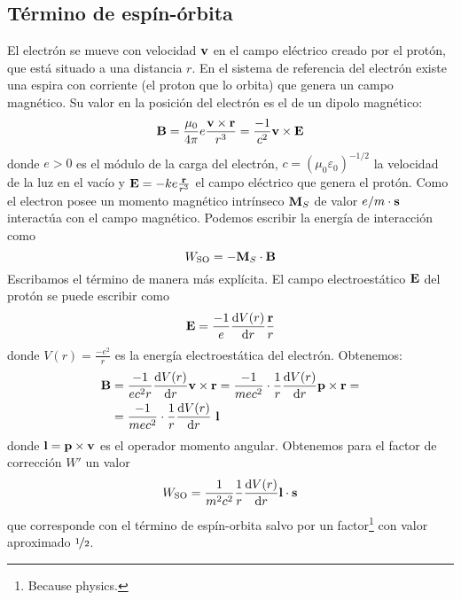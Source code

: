 \subsection{Término de espín-órbita}
El electrón se mueve con velocidad $\bm{\mathrm{v}}$ en el campo eléctrico
creado por el protón, que está situado a una distancia $r$. En el sistema de referencia del electrón existe
una espira con corriente (el proton que lo orbita) que genera un campo
magnético. Su valor en la posición del electrón es el de un dipolo magnético:
\begin{equation}
\bm{\mathrm{B}}= \frac{\mu_0}{4\pi} e \frac{\bm{\mathrm{v}}\times
  \bm{\mathrm{r}}}{r^3} = \frac{-1}{c^2} \bm{\mathrm{v}}\times \bm{\mathrm{E}}
\end{equation}
donde $e > 0$ es el módulo de la carga del electrón, $c = (\mu_0
\varepsilon_0)^{-1/2}$ la velocidad de la luz en el vacío y $\bm{\mathrm{E}} =
-k e \frac{\bm{\mathrm{r}}}{r^3}$ el campo eléctrico que genera el protón.
Como el electron posee un momento magnético intrínseco
$\bm{\mathrm{M}}_S$ de valor $e/m \cdot \bm{\mathrm{s}}$ interactúa con el campo
magnético. Podemos escribir la energía de interacción como
\begin{equation}
  W_{\text{SO}} = - \bm{\mathrm{M}}_S \cdot \bm{\mathrm{B}}
\end{equation}
Escribamos el término de manera más explícita. El campo
electroestático $\bm{\mathrm{E}}$ del protón se puede escribir como
\begin{equation}
  \bm{\mathrm{E}} = \frac{-1}{e} \dv{V(r)}{r} \frac{\bm{\mathrm{r}}}{r}
\end{equation}
donde $V(r) = \frac{-e^2}{r}$ es la energía electroestática del
electrón. Obtenemos:
\begin{equation}
  \begin{split}
    \bm{\mathrm{B}} &= \frac{-1}{ec^2r} \dv{V(r)}{r} \bm{\mathrm{v}}\times
    \bm{\mathrm{r}} = \frac{-1}{mec^2 }\cdot \frac{1}{r}\dv{V(r)}{r}
    \bm{\mathrm{p}}\times{\bm{\mathrm{r}}} = \\ &= \frac{-1}{mec^2 }\cdot \frac{1}{r}\dv{V(r)}{r}
    \ \bm{\mathrm{l}}
  \end{split}
\end{equation}
donde $\bm{\mathrm{l}} = \bm{\mathrm{p}}\times \bm{\mathrm{v}}$ es el operador
momento angular. Obtenemos para el factor de corrección $W'$ un valor
\begin{equation}
  W_\text{SO} = \frac{1}{m^2c^2}\frac{1}{r}\dv{V(r)}{r} \bm{\mathrm{l}}\cdot \bm{\mathrm{s}}
\end{equation}
que corresponde con el término de espín-orbita salvo por un
factor\footnote{Because physics.} con valor aproximado ${\nicefrac{1}{2}}$.


